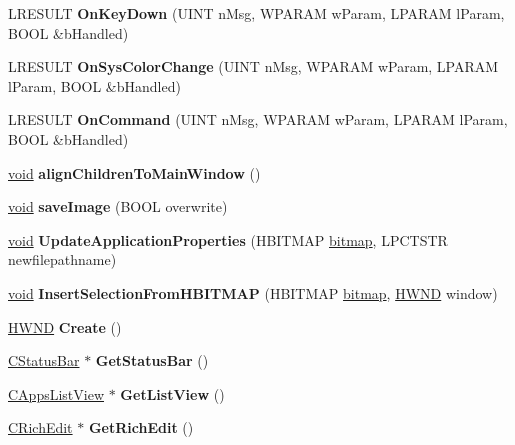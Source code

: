\begin{DoxyCompactItemize}
\item 
\mbox{\label{class_c_main_window_a2ffd15c16942a5b4049764a364623e7b}} 
L\+R\+E\+S\+U\+LT {\bfseries On\+Key\+Down} (U\+I\+NT n\+Msg, W\+P\+A\+R\+AM w\+Param, L\+P\+A\+R\+AM l\+Param, B\+O\+OL \&b\+Handled)
\item 
\mbox{\label{class_c_main_window_a09fb5175a6eeb08a1e08b88a9465000b}} 
L\+R\+E\+S\+U\+LT {\bfseries On\+Sys\+Color\+Change} (U\+I\+NT n\+Msg, W\+P\+A\+R\+AM w\+Param, L\+P\+A\+R\+AM l\+Param, B\+O\+OL \&b\+Handled)
\item 
\mbox{\label{class_c_main_window_a9f2793e2c69daa8b2522c57c96cf12f2}} 
L\+R\+E\+S\+U\+LT {\bfseries On\+Command} (U\+I\+NT n\+Msg, W\+P\+A\+R\+AM w\+Param, L\+P\+A\+R\+AM l\+Param, B\+O\+OL \&b\+Handled)
\item 
\mbox{\label{class_c_main_window_a27ac75e70d4a44246430d1306b947846}} 
\hyperlink{interfacevoid}{void} {\bfseries align\+Children\+To\+Main\+Window} ()
\item 
\mbox{\label{class_c_main_window_ac729397cf29aefabea2ed03f217d0474}} 
\hyperlink{interfacevoid}{void} {\bfseries save\+Image} (B\+O\+OL overwrite)
\item 
\mbox{\label{class_c_main_window_a6e01303783073196481e15dd725f8738}} 
\hyperlink{interfacevoid}{void} {\bfseries Update\+Application\+Properties} (H\+B\+I\+T\+M\+AP \hyperlink{structbitmap}{bitmap}, L\+P\+C\+T\+S\+TR newfilepathname)
\item 
\mbox{\label{class_c_main_window_a14914299c55ded6c1c7f08679e8bd7a2}} 
\hyperlink{interfacevoid}{void} {\bfseries Insert\+Selection\+From\+H\+B\+I\+T\+M\+AP} (H\+B\+I\+T\+M\+AP \hyperlink{structbitmap}{bitmap}, \hyperlink{interfacevoid}{H\+W\+ND} window)
\item 
\mbox{\label{class_c_main_window_adc196bfd0560aa43785b678cefb9a66c}} 
\hyperlink{interfacevoid}{H\+W\+ND} {\bfseries Create} ()
\item 
\mbox{\label{class_c_main_window_a453e2bdbb9c8ebc8576e92f578f6ed56}} 
\hyperlink{class_c_status_bar}{C\+Status\+Bar} $\ast$ {\bfseries Get\+Status\+Bar} ()
\item 
\mbox{\label{class_c_main_window_a431199b6596efda5fc803017034e9f01}} 
\hyperlink{class_c_apps_list_view}{C\+Apps\+List\+View} $\ast$ {\bfseries Get\+List\+View} ()
\item 
\mbox{\label{class_c_main_window_a54efef74bc0ee460db9ae91e3bc0f361}} 
\hyperlink{class_c_rich_edit}{C\+Rich\+Edit} $\ast$ {\bfseries Get\+Rich\+Edit} ()
\end{DoxyCompactItemize}
